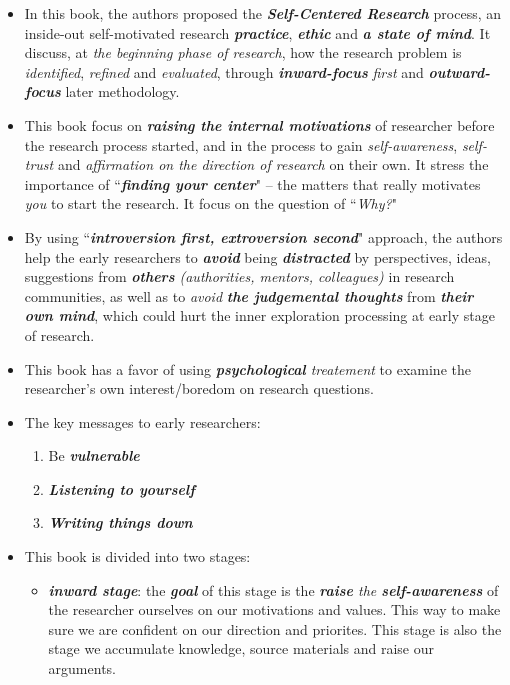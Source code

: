 \documentclass[11pt]{article}
\begin{document}
\begin{itemize}
\item In this book, the authors proposed the \emph{\textbf{Self-Centered Research}} process, an inside-out self-motivated research \emph{\textbf{practice}}, \emph{\textbf{ethic}} and \emph{\textbf{a state of mind}}. It discuss, at \emph{the beginning phase of research}, how the research problem is \emph{identified}, \emph{refined} and \emph{evaluated}, through \emph{\textbf{inward-focus}} \emph{first} and \emph{\textbf{outward-focus}} later methodology. 

\item This book focus on \emph{\textbf{raising the internal motivations}} of researcher before the research process started, and in the process to gain \emph{self-awareness}, \emph{self-trust} and \emph{affirmation on the direction of research} on their own. It stress the importance of ``\emph{\textbf{finding your center}}" -- the matters that really motivates \emph{you} to start the research.  It focus on the question of ``\emph{Why?}"

\item By using ``\emph{\textbf{introversion first, extroversion second}}" approach, the authors help the early researchers to \emph{\textbf{avoid}} being \emph{\textbf{distracted}} by perspectives, ideas, suggestions from \emph{\textbf{others} (authorities, mentors, colleagues)} in research communities, as well as to \emph{avoid} \emph{\textbf{the judgemental thoughts}} from \emph{\textbf{their own mind}}, which could hurt the inner exploration processing at early stage of research. 

\item This book has a favor of using \emph{\textbf{psychological} treatement} to examine the researcher's own interest/boredom on research questions.

\item The key messages to early researchers:
\begin{enumerate}
\item Be  \emph{\textbf{vulnerable}}
\item \emph{\textbf{Listening to yourself}}
\item \emph{\textbf{Writing things down}}
\end{enumerate}

\item This book is divided into two stages:
\begin{itemize}
\item \emph{\textbf{inward stage}}: the \emph{\textbf{goal}} of this stage is the \emph{\textbf{raise} the \textbf{self-awareness}} of the researcher ourselves on our motivations and values. This way to make sure we are confident on our direction and priorites. This stage is also the stage we accumulate knowledge, source materials and raise our arguments.


\end{itemize}
\end{itemize}
\end{document}
